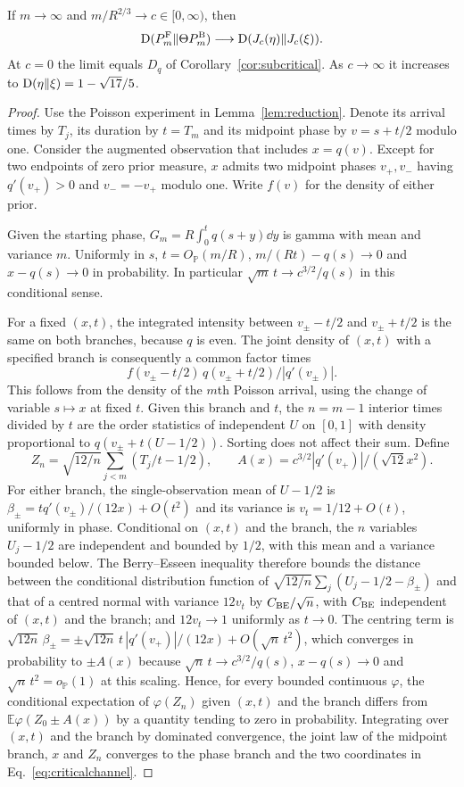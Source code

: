 \begin{theorem}\label{th:critical}
If $m\to\infty$ and $m/R^{2/3}\to c\in[0,\infty)$, then
\[
 \mathrm D(P_m^\mathrm F\|\Theta P_m^\mathrm B)\longrightarrow
 \mathrm D(J_c(\eta)\|J_c(\xi)).
\]
At $c=0$ the limit equals $D_q$ of Corollary~\ref{cor:subcritical}. As $c\to\infty$ it increases to $\mathrm D(\eta\|\xi)=1-\sqrt{17}/5$.
\end{theorem}
\begin{proof}
Use the Poisson experiment in Lemma~\ref{lem:reduction}. Denote its arrival times by $T_j$, its duration by $t=T_m$ and its midpoint phase by $v=s+t/2$ modulo one. Consider the augmented observation that includes $x=q(v)$. Except for two endpoints of zero prior measure, $x$ admits two midpoint phases $v_+,v_-$ having $q'(v_+)>0$ and $v_-=-v_+$ modulo one. Write $f(v)$ for the density of either prior.

Given the starting phase, $G_m=R\int_0^t q(s+y)\dd y$ is gamma with mean and variance $m$. Uniformly in $s$, $t=O_{\mathbb P}(m/R)$, $m/(Rt)-q(s)\to0$ and $x-q(s)\to0$ in probability. In particular $\sqrt{m}\,t\to c^{3/2}/q(s)$ in this conditional sense.

For a fixed $(x,t)$, the integrated intensity between $v_\pm-t/2$ and $v_\pm+t/2$ is the same on both branches, because $q$ is even. The joint density of $(x,t)$ with a specified branch is consequently a common factor times
\[
 f(v_\pm-t/2)\,q(v_\pm+t/2)/|q'(v_\pm)|.
\]
This follows from the density of the $m$th Poisson arrival, using the change of variable $s\mapsto x$ at fixed $t$. Given this branch and $t$, the $n=m-1$ interior times divided by $t$ are the order statistics of independent $U$ on $[0,1]$ with density proportional to $q(v_\pm+t(U-1/2))$. Sorting does not affect their sum. Define
\[
 Z_n=\sqrt{12/n}\sum_{j<m}(T_j/t-1/2),\qquad
 A(x)=c^{3/2}|q'(v_+)|/(\sqrt{12}x^2).
\]
For either branch, the single-observation mean of $U-1/2$ is $\beta_\pm=t q'(v_\pm)/(12x)+O(t^2)$ and its variance is $v_t=1/12+O(t)$, uniformly in phase. Conditional on $(x,t)$ and the branch, the $n$ variables $U_j-1/2$ are independent and bounded by $1/2$, with this mean and a variance bounded below. The Berry--Esseen inequality therefore bounds the distance between the conditional distribution function of $\sqrt{12/n}\sum_j(U_j-1/2-\beta_\pm)$ and that of a centred normal with variance $12v_t$ by $C_{\rm BE}/\sqrt n$, with $C_{\rm BE}$ independent of $(x,t)$ and the branch; and $12v_t\to1$ uniformly as $t\to0$. The centring term is $\sqrt{12n}\,\beta_\pm=\pm\sqrt{12n}\,t\,|q'(v_+)|/(12x)+O(\sqrt n\,t^2)$, which converges in probability to $\pm A(x)$ because $\sqrt n\,t\to c^{3/2}/q(s)$, $x-q(s)\to0$ and $\sqrt n\, t^2=o_{\mathbb P}(1)$ at this scaling. Hence, for every bounded continuous $\varphi$, the conditional expectation of $\varphi(Z_n)$ given $(x,t)$ and the branch differs from $\mathbb E\varphi(Z_0\pm A(x))$ by a quantity tending to zero in probability. Integrating over $(x,t)$ and the branch by dominated convergence, the joint law of the midpoint branch, $x$ and $Z_n$ converges to the phase branch and the two coordinates in Eq.~\eqref{eq:criticalchannel}.


\end{proof}
